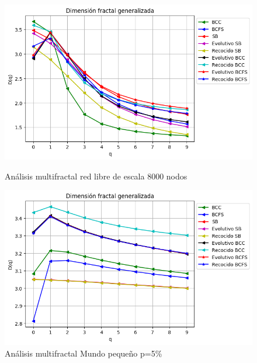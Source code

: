 \begin{figure}[!htb]
    \begin{minipage}{0.48\textwidth}
        \centering
        \includegraphics[scale=0.5]{CapituloAAnexos/imagenesAnexoC/Fractalidad/grafica_Dq20180525_061308ScaleFree8000Nodes.png}
    \caption{Análisis multifractal red libre de escala 8000 nodos}
    \end{minipage}\hfill
   \begin{minipage}{0.48\textwidth}
         \centering
        \includegraphics[scale=0.5]{CapituloAAnexos/imagenesAnexoC/Fractalidad/grafica_Dq20180509_024709SmallWorld5000NodesRewire005.png}
    \caption{Análisis multifractal Mundo pequeño p=5\%}
    \end{minipage}
\end{figure}

